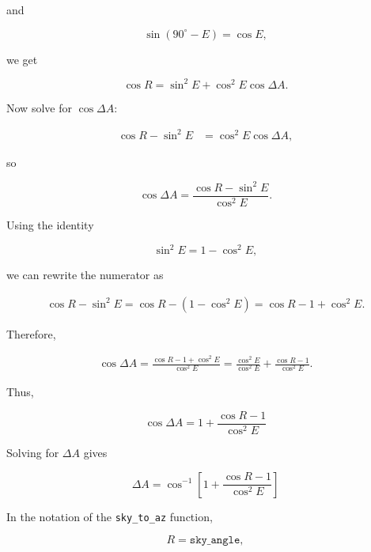 \documentclass[12pt]{extarticle}
\begin{document}
and

\begin{equation} \sin(90^\circ-E)=\cos E, \end{equation}

we get

\begin{equation}
\cos R=\sin^2 E+\cos^2 E\cos\Delta A.
\end{equation}

Now solve for $\cos\Delta A$:

\begin{align}
\cos R - \sin^2 E
&=
\cos^2 E \cos\Delta A ,
\end{align}

so

\begin{equation}
\cos\Delta A = \frac{\cos R-\sin^2 E}{\cos^2 E}.
\end{equation}

Using the identity

\begin{equation} \sin^2 E = 1 - \cos^2 E, \end{equation}

we can rewrite the numerator as

\begin{align}
\cos R - \sin^2 E=
\cos R - (1-\cos^2 E) =
\cos R - 1 + \cos^2 E .
\end{align}

Therefore,

\begin{align}
\cos\Delta A=
\frac{\cos R - 1 + \cos^2 E}{\cos^2 E} =
\frac{\cos^2 E}{\cos^2 E}
+
\frac{\cos R - 1}{\cos^2 E}.
\end{align}

Thus,

\begin{equation}
\boxed{
\cos\Delta A
=1+
\frac{\cos R-1}{\cos^2 E}}
\label{eq:simplified-xel-to-az}
\end{equation}

Solving for $\Delta A$ gives

\begin{equation}
\boxed{
\Delta A=\cos^{-1}
\left[
1+
\frac{\cos R-1}{\cos^2 E}
\right]
}
\label{eq:simplified-xel-to-az-solved}
\end{equation}

In the notation of the \texttt{sky\_to\_az} function,

\begin{equation} R = \texttt{sky\_angle}, \end{equation}
\end{document}

